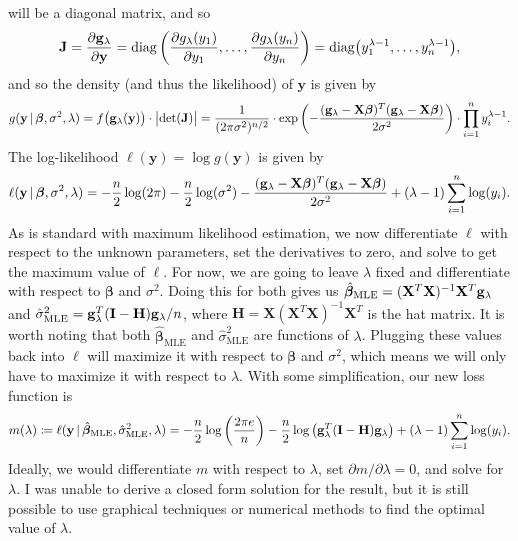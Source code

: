 \documentclass[10pt]{article}
\begin{document}
will be a diagonal matrix, and so 
\begin{align*}
    \mathbf{J}
    = \frac{\partial \mathbf{g}_{\lambda}}{\partial \mathbf{y}}
    = \mathrm{diag} \left( \frac{\partial g_{\lambda}(y_1)}{\partial y_1}, \ldots, \frac{\partial g_{\lambda}(y_n)}{\partial y_n} \right)
    = \mathrm{diag} \big( y_1^{\lambda - 1}, \ldots, y_n^{\lambda - 1} \big), 
\end{align*}
and so the density (and thus the likelihood) of \(\mathbf{y}\) is given by 
\begin{align*}
    g(\mathbf{y} \,|\, \bm{\beta}, \sigma^2, \lambda)
    = f \big( \mathbf{g}_{\lambda}(\mathbf{y}) \big) \cdot \big|\mathrm{det}(\mathbf{J})\big|
    = \frac{1}{(2\pi\sigma^2)^{n/2}} \cdot \mathrm{exp} \left( - \frac{(\mathbf{g}_{\lambda} - \mathbf{X}\bm{\beta})^T (\mathbf{g}_{\lambda} - \mathbf{X}\bm{\beta})}{2 \sigma^2} \right) \cdot \prod_{i=1}^n y_i^{\lambda - 1}.
\end{align*}
The log-likelihood \(\ell(\mathbf{y}) = \log g(\mathbf{y})\) is given by 
\begin{align*}
    \ell(\mathbf{y} \,|\, \bm{\beta}, \sigma^2, \lambda) 
    = - \frac{n}{2} \log (2\pi) - \frac{n}{2} \log (\sigma^2) - \frac{(\mathbf{g}_{\lambda} - \mathbf{X}\bm{\beta})^T (\mathbf{g}_{\lambda} - \mathbf{X}\bm{\beta})}{2 \sigma^2} + (\lambda - 1) \sum_{i=1}^n \log (y_i).
\end{align*}
As is standard with maximum likelihood estimation, we now differentiate \(\ell\) with respect to the unknown parameters, set the derivatives to zero, and solve to get the maximum value of \(\ell\). 
For now, we are going to leave \(\lambda\) fixed and differentiate with respect to \(\bm{\beta}\) and \(\sigma^2\). Doing this for both gives us 
\(\hat{\bm{\beta}}_{\mathrm{MLE}} = (\mathbf{X}^T\mathbf{X})^{-1}\mathbf{X}^T\mathbf{g}_{\lambda}\) and \(\hat{\sigma}^2_{\mathrm{MLE}} = \mathbf{g}_{\lambda}^T (\mathbf{I} - \mathbf{H}) \mathbf{g}_{\lambda} / n\), where 
\(\mathbf{H} = \mathbf{X}(\mathbf{X}^T\mathbf{X})^{-1}\mathbf{X}^T\) is the hat matrix. 
It is worth noting that both \(\hat{\bm{\beta}}_{\mathrm{MLE}}\) and \(\hat{\sigma}^2_{\mathrm{MLE}}\) are functions of \(\lambda\). 
Plugging these values back into \(\ell\) will maximize it with respect to \(\bm{\beta}\) and \(\sigma^2\), 
which means we will only have to maximize it with respect to \(\lambda\). 
With some simplification, our new loss function is 
\begin{align*}
    m(\lambda)
    \coloneqq \ell(\mathbf{y} \,|\, \hat{\bm{\beta}}_{\mathrm{MLE}}, \hat{\sigma}^2_{\mathrm{MLE}}, \lambda)
    = - \frac{n}{2} \log \left( \frac{2 \pi e}{n} \right) - \frac{n}{2} \log \big( \mathbf{g}_{\lambda}^T(\mathbf{I} - \mathbf{H}) \mathbf{g}_{\lambda} \big) + (\lambda - 1) \sum_{i=1}^n \log(y_i).
\end{align*}
Ideally, we would differentiate \(m\) with respect to \(\lambda\), set \(\partial m / \partial \lambda = 0\), and solve for \(\lambda\). I was unable to 
derive a closed form solution for the result, but it is still possible to use graphical techniques or numerical methods to find the optimal value of \(\lambda\). 
\end{document}
